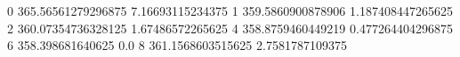 0 365.56561279296875 7.16693115234375
1 359.5860900878906 1.187408447265625
2 360.07354736328125 1.67486572265625
4 358.8759460449219 0.477264404296875
6 358.398681640625 0.0
8 361.1568603515625 2.7581787109375
